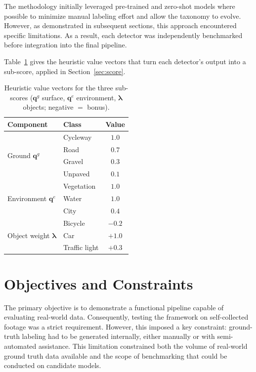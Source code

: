 \documentclass[letterpaper,journal]{IEEEtran}
\begin{document}
The methodology initially leveraged pre-trained and zero-shot models where
possible to minimize manual labeling effort and allow the taxonomy to
evolve. However, as demonstrated in subsequent sections, this approach
encountered specific limitations. As a result, each detector was
independently benchmarked before integration into the final pipeline.

Table~\ref{tab:quality} gives the heuristic value vectors that turn each detector's
output into a sub-score, applied in Section~\ref{sec:score}.

\begin{table}[H]
\caption{Heuristic value vectors for the three sub-scores ($\mathbf{q}^{g}$ surface,
$\mathbf{q}^{e}$ environment, $\boldsymbol{\lambda}$ objects; negative $=$ bonus).}
\label{tab:quality}
\centering
\scriptsize
\setlength{\tabcolsep}{4pt}
\renewcommand{\arraystretch}{0.95}
\begin{tabular}{@{}llc@{}}
\toprule
\textbf{Component} & \textbf{Class} & \textbf{Value}\\
\midrule
\multirow{4}{*}{Ground $\mathbf{q}^{g}$}
  & Cycleway & $1.0$\\
  & Road     & $0.7$\\
  & Gravel   & $0.3$\\
  & Unpaved  & $0.1$\\
\midrule
\multirow{3}{*}{Environment $\mathbf{q}^{e}$}
  & Vegetation & $1.0$\\
  & Water      & $1.0$\\
  & City       & $0.4$\\
\midrule
\multirow{3}{*}{Object weight $\boldsymbol{\lambda}$}
  & Bicycle       & $-0.2$\\
  & Car           & $+1.0$\\
  & Traffic light & $+0.3$\\
\bottomrule
\end{tabular}
\end{table}

\section{Objectives and Constraints}

The primary objective is to demonstrate a functional pipeline capable of
evaluating real-world data. Consequently, testing the framework on
self-collected footage was a strict requirement. However, this imposed a
key constraint: ground-truth labeling had to be generated internally,
either manually or with semi-automated assistance. This limitation
constrained both the volume of real-world ground truth data available and
the scope of benchmarking that could be conducted on candidate models.
\end{document}
